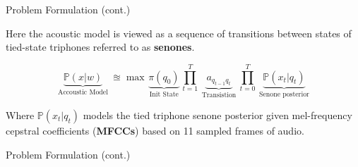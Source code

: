 \documentclass[notes]{beamer}
\newcommand{\cprob}[2]{ \prob{#1 \lvert #2} }
\newcommand{\prob}[1]{\mathbb{P}\left( #1 \right)}
\begin{document}
\begin{frame}{Problem Formulation (cont.)}
	\begin{center}
	Here the acoustic model is viewed as a sequence of transitions between states of tied-state triphones referred to as \textbf{senones}.
	\end{center}
	
	\vfill
	
	\begin{equation*}
	\underbrace{\cprob{x}{w}}_{\text{ Accoustic Model }} \approxeq \max \underbrace{\pi(q_0)}_{ \text{ Init State } } \prod_{t = 1}^T \underbrace{ a_{q_{t-1} q_t} }_{ \text{ Transistion } } \prod_{t=0}^T \underbrace{ \cprob{x_t}{q_t} }_{ \text{ Senone posterior } } 
	\label{eqn:lm:def}
	\end{equation*}
	
	\vfill
	
	\begin{center}
		Where $\cprob{x_t}{q_t}$ models the tied triphone senone posterior given mel-frequency cepstral coefficients (\textbf{MFCCs}) based on 11 sampled frames of audio.
	\end{center}
\end{frame}

\begin{frame}{Problem Formulation (cont.)}
\end{frame}
\end{document}
